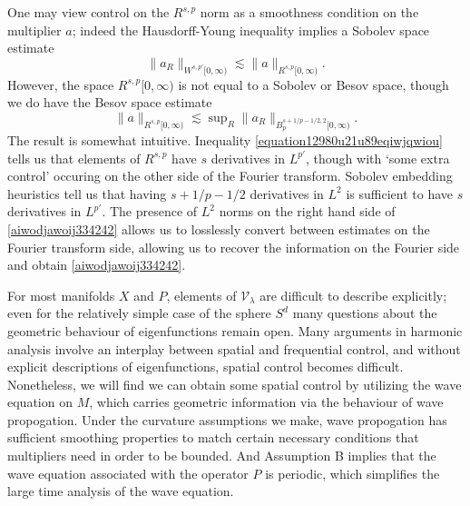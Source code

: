 %
%

One may view control on the $R^{s,p}$ norm as a smoothness condition on the multiplier $a$; indeed the Hausdorff-Young inequality implies a Sobolev space estimate
%
\begin{equation} \label{equation12980u21u89eqiwjqwiou}
  \| a_R \|_{W^{s,p'}[0,\infty)} \lesssim \| a \|_{R^{s,p}[0,\infty)}.
\end{equation}
%
However, the space $R^{s,p}[0,\infty)$ is not equal to a Sobolev or Besov space, though we do have the Besov space estimate
%
\begin{equation} \label{aiwodjawoij334242}
  \| a \|_{R^{s,p}[0,\infty)} \lesssim \sup\nolimits_R \| a_R \|_{B^{s+1/p - 1/2,2}_p[0,\infty)}.
\end{equation}
%
The result is somewhat intuitive. Inequality \eqref{equation12980u21u89eqiwjqwiou} tells us that elements of $R^{s,p}$ have $s$ derivatives in $L^{p'}$, though with `some extra control' occuring on the other side of the Fourier transform. Sobolev embedding heuristics tell us that having $s + 1/p - 1/2$ derivatives in $L^2$ is sufficient to have $s$ derivatives in $L^{p'}$. The presence of $L^2$ norms on the right hand side of \eqref{aiwodjawoij334242} allows us to losslessly convert between estimates on the Fourier transform side, allowing us to recover the information on the Fourier side and obtain \eqref{aiwodjawoij334242}.

% 

For most manifolds $X$ and $P$, elements of $\mathcal{V}_\lambda$ are difficult to describe explicitly; even for the relatively simple case of the sphere $S^d$ many questions about the geometric behaviour of eigenfunctions remain open. Many arguments in harmonic analysis involve an interplay between spatial and frequential control, and without explicit descriptions of eigenfunctions, spatial control becomes difficult. Nonetheless, we will find we can obtain some spatial control by utilizing the wave equation on $M$, which carries geometric information via the behaviour of wave propogation. Under the curvature assumptions we make, wave propogation has sufficient smoothing properties to match certain necessary conditions that multipliers need in order to be bounded. And Assumption B implies that the wave equation associated with the operator $P$ is periodic, which simplifies the large time analysis of the wave equation.

